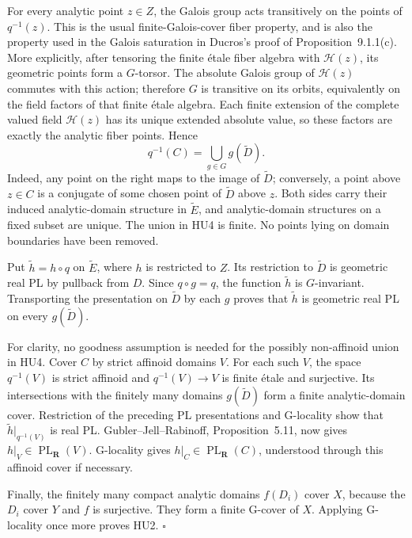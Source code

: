 For every analytic point $z\in Z$, the Galois group acts transitively
on the points of $q^{-1}(z)$.  This is the usual finite-Galois-cover
fiber property, and is also the property used in the Galois
saturation in Ducros's proof of Proposition~9.1.1(c).  More
explicitly, after tensoring the finite \'etale fiber algebra with
$\mathscr H(z)$, its geometric points form a $G$-torsor.  The
absolute Galois group of $\mathscr H(z)$ commutes with this action;
therefore $G$ is transitive on its orbits, equivalently on the field
factors of that finite \'etale algebra.  Each finite extension of the
complete valued field $\mathscr H(z)$ has its unique extended
absolute value, so these factors are exactly the analytic fiber
points.  Hence
\[
 q^{-1}(C)=\bigcup_{g\in G}g(\widetilde D).              \tag{HU4}
\]
Indeed, any point on the right maps to the image of $\widetilde D$;
conversely, a point above $z\in C$ is a conjugate of some chosen
point of $\widetilde D$ above $z$.  Both sides carry their induced
analytic-domain structure in $\widetilde E$, and analytic-domain
structures on a fixed subset are unique.  The union in HU4 is
finite.  No points lying on domain boundaries have been removed.

Put $\widetilde h=h\circ q$ on $\widetilde E$, where $h$ is restricted
to $Z$.  Its restriction to $\widetilde D$ is geometric real PL by
pullback from $D$.  Since $q\circ g=q$, the function $\widetilde h$
is $G$-invariant.  Transporting the presentation on $\widetilde D$
by each $g$ proves that $\widetilde h$ is geometric real PL on every
$g(\widetilde D)$.

For clarity, no goodness assumption is needed for the possibly
non-affinoid union in HU4.  Cover $C$ by strict affinoid domains $V$.
For each such $V$, the space $q^{-1}(V)$ is strict affinoid and
$q^{-1}(V)\to V$ is finite \'etale and surjective.  Its intersections
with the finitely many domains $g(\widetilde D)$ form a finite
analytic-domain cover.  Restriction of the preceding PL
presentations and G-locality show that
$\widetilde h|_{q^{-1}(V)}$ is real PL.  Gubler--Jell--Rabinoff,
Proposition~5.11, now gives $h|_V\in\operatorname{PL}_{\mathbf R}(V)$.
G-locality gives $h|_C\in\operatorname{PL}_{\mathbf R}(C)$, understood
through this affinoid cover if necessary.

Finally, the finitely many compact analytic domains $f(D_i)$ cover
$X$, because the $D_i$ cover $Y$ and $f$ is surjective.  They form a
finite G-cover of $X$.  Applying G-locality once more proves HU2.
\hfill$\square$

